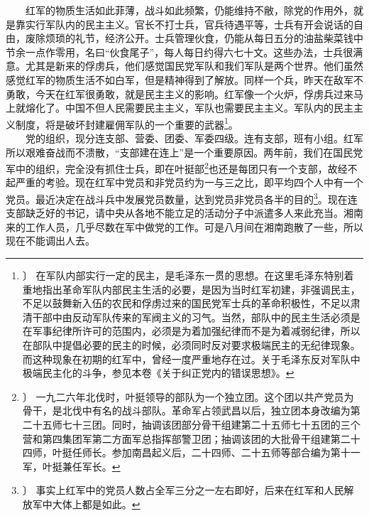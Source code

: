 \documentclass[cn,11pt,chinese]{elegantbook}
\begin{document}
　　红军的物质生活如此菲薄，战斗如此频繁，仍能维持不敝，除党的作用外，就是靠实行军队内的民主主义。官长不打士兵，官兵待遇平等，士兵有开会说话的自由，废除烦琐的礼节，经济公开。士兵管理伙食，仍能从每日五分的油盐柴菜钱中节余一点作零用，名曰“伙食尾子”，每人每日约得六七十文。这些办法，士兵很满意。尤其是新来的俘虏兵，他们感觉国民党军队和我们军队是两个世界。他们虽然感觉红军的物质生活不如白军，但是精神得到了解放。同样一个兵，昨天在敌军不勇敢，今天在红军很勇敢，就是民主主义的影响。红军像一个火炉，俘虏兵过来马上就熔化了。中国不但人民需要民主主义，军队也需要民主主义。军队内的民主主义制度，将是破坏封建雇佣军队的一个重要的武器\footnote[17]{〕 在军队内部实行一定的民主，是毛泽东一贯的思想。在这里毛泽东特别着重地指出革命军队内部民主生活的必要，是因为当时红军初建，非强调民主，不足以鼓舞新入伍的农民和俘虏过来的国民党军士兵的革命积极性，不足以肃清干部中由反动军队传来的军阀主义的习气。当然，部队中的民主生活必须是在军事纪律所许可的范围内，必须是为着加强纪律而不是为着减弱纪律，所以在部队中提倡必要的民主的时候，必须同时反对要求极端民主的无纪律现象。而这种现象在初期的红军中，曾经一度严重地存在过。关于毛泽东反对军队中极端民主化的斗争，参见本卷《关于纠正党内的错误思想》。}。\\
　　党的组织，现分连支部、营委、团委、军委四级。连有支部，班有小组。红军所以艰难奋战而不溃散，“支部建在连上”是一个重要原因。两年前，我们在国民党军中的组织，完全没有抓住士兵，即在叶挺部\footnote[18]{〕 一九二六年北伐时，叶挺领导的部队为一个独立团。这个团以共产党员为骨干，是北伐中有名的战斗部队。革命军占领武昌以后，独立团本身改编为第二十五师七十三团。同时，抽调该团部分骨干组建第二十五师七十五团的三个营和第四集团军第二方面军总指挥部警卫团；抽调该团的大批骨干组建第二十四师，叶挺任师长。参加南昌起义后，二十四师、二十五师等部合编为第十一军，叶挺兼任军长。}也还是每团只有一个支部，故经不起严重的考验。现在红军中党员和非党员约为一与三之比，即平均四个人中有一个党员。最近决定在战斗兵中发展党员数量，达到党员非党员各半的目的\footnote[19]{〕 事实上红军中的党员人数占全军三分之一左右即好，后来在红军和人民解放军中大体上都是如此。}。现在连支部缺乏好的书记，请中央从各地不能立足的活动分子中派遣多人来此充当。湘南来的工作人员，几乎尽数在军中做党的工作。可是八月间在湘南跑散了一些，所以现在不能调出人去。\\
\end{document}
